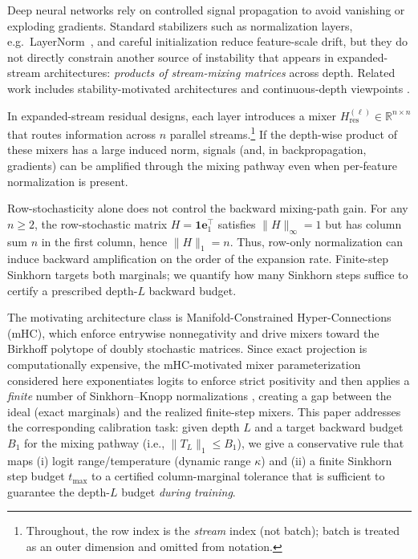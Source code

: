 \documentclass[11pt]{article}
\numberwithin{equation}{section}
\theoremstyle{plain}
\theoremstyle{definition}
\theoremstyle{remark}
\newcommand{\R}{\mathbb{R}}
\newcommand{\ones}{\mathbf{1}}
\newcommand{\Hres}{H_{\mathrm{res}}}
\begin{document}
Deep neural networks rely on controlled signal propagation to avoid vanishing or exploding gradients. Standard stabilizers
such as normalization layers, e.g.\ LayerNorm~\citep{Ba2016LayerNorm}, and careful initialization reduce feature-scale drift, but they do not directly
constrain another source of instability that appears in expanded-stream architectures: \emph{products of stream-mixing matrices}
across depth. Related work includes stability-motivated architectures \citep{HaberRuthotto2018} and continuous-depth viewpoints \citep{Chen2018NeuralODE}.

In expanded-stream residual designs, each layer introduces a mixer $\Hres^{(\ell)}\in\R^{n\times n}$ that routes information across
$n$ parallel streams.\footnote{Throughout, the row index is the \emph{stream} index (not batch); batch is treated as an outer dimension and omitted from notation.}
If the depth-wise product of these mixers has a large induced norm, signals (and, in backpropagation, gradients) can be amplified through the mixing pathway even when per-feature normalization is present.

Row-stochasticity alone does not control the backward mixing-path gain. For any $n\ge 2$, the row-stochastic matrix
$H=\ones \mathbf{e}_1^\top$ satisfies $\|H\|_\infty=1$ but has column sum $n$ in the first column, hence $\|H\|_1=n$.
Thus, row-only normalization can induce backward amplification on the order of the expansion rate.
Finite-step Sinkhorn targets both marginals; we quantify how many Sinkhorn steps suffice to certify a prescribed depth-$L$ backward budget.

The motivating architecture class is Manifold-Constrained Hyper-Connections (mHC), which enforce entrywise nonnegativity and drive mixers toward the Birkhoff polytope of doubly stochastic matrices. Since exact projection is computationally expensive, the mHC-motivated mixer parameterization considered here
exponentiates logits to enforce strict positivity and then applies a \emph{finite} number of Sinkhorn--Knopp normalizations \citep{SinkhornKnopp1967,Knight2008}, creating a gap
between the ideal (exact marginals) and the realized finite-step mixers. This paper addresses the corresponding calibration task:
given depth $L$ and a target backward budget $B_1$ for the mixing pathway (i.e., $\|T_L\|_1\le B_1$), we give a conservative rule that maps
(i) logit range/temperature (dynamic range $\kappa$) and (ii) a finite Sinkhorn step budget $t_{\max}$ to a certified column-marginal tolerance that is sufficient to guarantee the depth-$L$ budget \emph{during training}.
\end{document}
